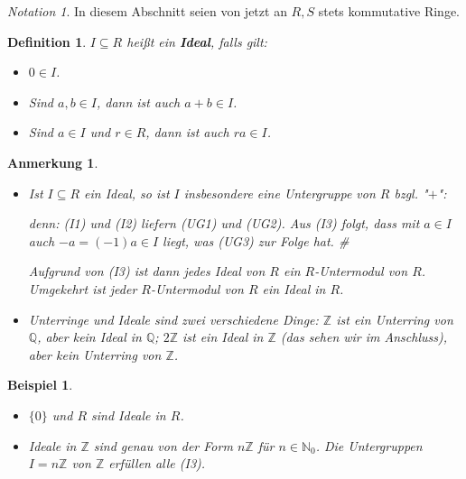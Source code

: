 \documentclass[a4paper, twoside, 11pt, ngerman]{report}
\newcommand{\NN}{\mathds N}
\newcommand{\QQ}{\mathds Q}
\newcommand{\ZZ}{\mathds Z}
\theoremstyle{definistyle}
\newtheorem{defini}[satz]{Definition}
\newtheorem{anm}[satz]{Anmerkung}
\newtheorem{bsp}[satz]{Beispiel}
\theoremstyle{remark}
\newtheorem*{notation}{Notation}
\newenvironment{denn}%
  {\par\textit{denn:}}%
  {\hfill\#\par}
\newcommand{\defn}[1]{\textit{\bfseries #1}}
\begin{document}
\begin{notation}
In diesem Abschnitt seien von jetzt an $R, S$ stets kommutative Ringe.
\end{notation}

\begin{defini}\label{def:ideal}
$I \subseteq R$ heißt ein \defn{Ideal}, falls gilt:
\begin{itemize}
    \item[(I1)] $0 \in I$.
    \item[(I2)] Sind $a, b \in I$, dann ist auch $a + b \in I$.
    \item[(I3)] Sind $a \in I$ und $r \in R$, dann ist auch $r a \in I$.
\end{itemize}
\end{defini}

\begin{anm}
\begin{itemize}
\item Ist $I \subseteq R$ ein Ideal, so ist $I$ insbesondere eine Untergruppe von $R$ bzgl. "$+$":
\begin{denn}
(I1) und (I2) liefern (UG1) und (UG2). Aus (I3) folgt, dass mit $a \in I$ auch $-a=(-1)a \in I$ liegt, was (UG3) zur Folge hat.
\end{denn}
Aufgrund von (I3) ist dann jedes Ideal von $R$ ein $R$-Untermodul von $R$. Umgekehrt ist jeder
$R$-Untermodul von $R$ ein Ideal in $R$.
\item Unterringe und Ideale sind zwei verschiedene Dinge: $\ZZ$ ist ein Unterring von $\QQ$,
aber kein Ideal in $\QQ$; $2\mathbb{Z}$ ist ein Ideal in $\ZZ$ (das sehen wir im Anschluss),
aber kein Unterring von $\ZZ$. 

\end{itemize}
\end{anm}

\begin{bsp}\label{bsp:ideale}
\begin{itemize}
    \item $\{0\}$ und $R$ sind Ideale in $R$.
    \item Ideale in $\ZZ$ sind genau von der Form $n\ZZ$ für $n \in \NN_0$. Die Untergruppen $I = n\ZZ$ von $\ZZ$ erfüllen alle (I3).
\end{itemize}
\end{bsp}
\end{document}
